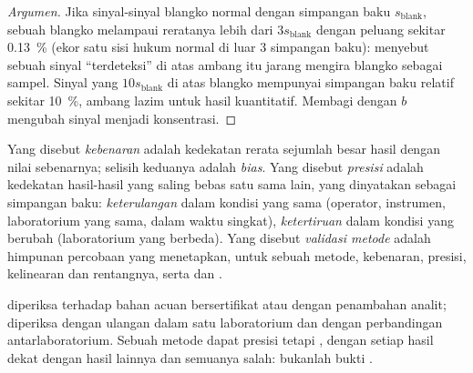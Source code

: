 \begin{proof}[Argumen]
Jika sinyal-sinyal blangko normal dengan simpangan baku $s_{\mathrm{blank}}$,
sebuah blangko melampaui reratanya lebih dari $3s_{\mathrm{blank}}$ dengan
peluang sekitar 0.13~\% (ekor satu sisi hukum normal di luar
3 simpangan baku): menyebut sebuah sinyal ``terdeteksi'' di atas ambang itu
jarang mengira blangko sebagai sampel. Sinyal yang $10s_{\mathrm{blank}}$ di
atas blangko mempunyai simpangan baku relatif sekitar
10~\%, ambang lazim untuk hasil kuantitatif. Membagi dengan $b$ mengubah
sinyal menjadi konsentrasi.
\end{proof}

\begin{definition}[Validasi]\label{def:b2:measurement-statistics:validation}
Yang disebut \emph{kebenaran} adalah kedekatan rerata
sejumlah besar hasil dengan nilai sebenarnya; selisih keduanya adalah
\emph{bias}. Yang disebut \emph{presisi} adalah
kedekatan hasil-hasil yang saling bebas satu sama lain, yang dinyatakan
sebagai simpangan baku: \emph{keterulangan} dalam
kondisi yang sama (operator, instrumen, laboratorium yang sama, dalam waktu
singkat), \emph{ketertiruan} dalam kondisi yang berubah
(laboratorium yang berbeda). Yang disebut \emph{validasi
metode} adalah himpunan percobaan yang menetapkan,
untuk sebuah metode, kebenaran, presisi, kelinearan dan rentangnya, serta
 dan .
\end{definition}

 diperiksa terhadap bahan acuan bersertifikat atau dengan
penambahan analit;  diperiksa dengan ulangan dalam satu laboratorium
dan dengan perbandingan antarlaboratorium. Sebuah metode dapat presisi
tetapi , dengan setiap hasil dekat dengan hasil lainnya dan semuanya
salah:  bukanlah bukti .

